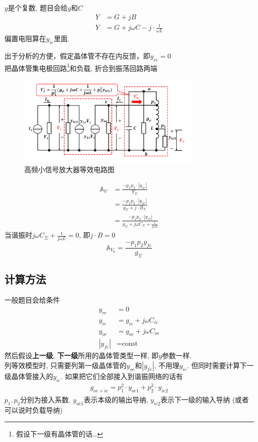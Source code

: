 \documentclass[a4paper]{report}
\begin{document}
$y$是个复数, 题目会给$g$和$C$
\begin{align*}
  Y&=G+jB\\
  Y&=G+j\omega C-j\cdot \frac{1}{\omega L}
\end{align*}
偏置电阻算在$y_{ie}$里面. 

出于分析的方便，假定晶体管不存在内反馈，即$y_{re}=0$\\
把晶体管集电极回路\footnote{假设下一级有晶体管的话\dots}和负载, 折合到振荡回路两端
\begin{figure}[H]
\centering
\includegraphics[width=0.8\textwidth]{amp_small_circuit_1.png}
\caption{高频小信号放大器等效电路图}
\end{figure}
\begin{align*}
  \mathbb{A}_V&=\frac{-p_1p_2\cdot |y_{fe}|}{Y_\Sigma}\\
  &=\frac{-p_1p_2\cdot |y_{fe}|}{g_\Sigma+j\cdot B_\Sigma}\\
  &=\frac{-p_1p_2\cdot |y_{fe}|}{g_\Sigma+j\omega C_\Sigma +\frac{1}{j\omega L}}
\end{align*}
当谐振时$j\omega C_\Sigma+\frac{1}{j\omega L}=0$, 即$j\cdot B=0$
$$\mathbb{A}_{V_0}=\frac{-p_1p_2y_{fe}}{g_\Sigma}$$
\subsection{计算方法}
一般题目会给条件
\begin{align*}
  y_{re}&=0\\
  y_{ie}&=g_{ie}+j\omega C_{ie}\\
  y_{oe}&=g_{oe}+j\omega C_{oe}\\
  |y_{fe}|&=\text{const}
\end{align*}
然后假设\textbf{上一级}, \textbf{下一级}所用的晶体管类型一样, 即$y$参数一样. \\
列等效模型时, 只需要列第一级晶体管的$y_{oe}$和$|y_{fe}|$, 不用理$y_{ie}$. 但同时需要计算下一级晶体管接入的$y_{ie}$. 如果把它们全部接入到谐振网络的话有
\begin{align*}
  g_{oe+ie}=p_1^2\cdot y_{oe1}+p_2^2\cdot y_{ie2}
\end{align*}
$p_1,p_2$分别为接入系数. $y_{oe1}$表示本级的输出导纳, $y_{ie2}$表示下一级的输入导纳 (或者可以说时负载导纳) 
\end{document}
